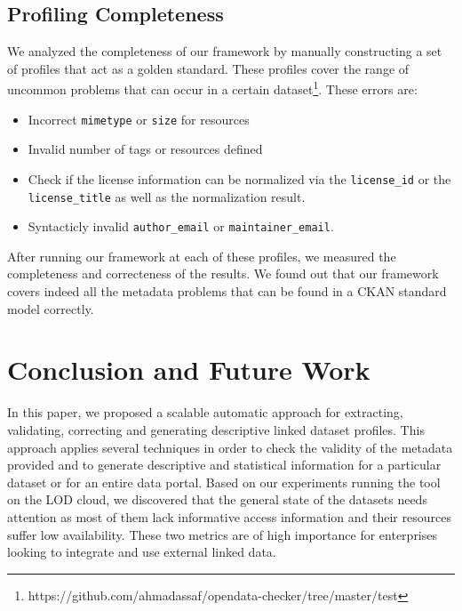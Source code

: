 \documentclass[runningheads,a4paper]{llncs}
\begin{document}
\subsection{Profiling Completeness}

We analyzed the completeness of our framework by manually constructing a set of profiles that act as a golden standard. These profiles cover the range of uncommon problems that can occur in a certain dataset\footnote{https://github.com/ahmadassaf/opendata-checker/tree/master/test}. These errors are:

\begin{itemize}
\item Incorrect \texttt{mimetype} or \texttt{size} for resources
\item Invalid number of tags or resources defined
\item Check if the license information can be normalized via the \texttt{license\_id} or the \texttt{license\_title} as well as the normalization result.
\item Syntacticly invalid \texttt{author\_email} or \texttt{maintainer\_email}.
\end{itemize}


After running our framework at each of these profiles, we measured the completeness and correcteness of the results. We found out that our framework covers indeed all the metadata problems that can be found in a CKAN standard model correctly.

\section{Conclusion and Future Work}
\label{sec:conclusion}

In this paper, we proposed a scalable automatic approach for extracting, validating, correcting and generating descriptive linked dataset profiles. This approach applies several techniques in order to check the validity of the metadata provided and to generate descriptive and statistical information for a particular dataset or for an entire data portal. Based on our experiments running the tool on the LOD cloud, we discovered that the general state of the datasets needs attention as most of them lack informative access information and their resources suffer low availability. These two metrics are of high importance for enterprises looking to integrate and use external linked data.
\end{document}
